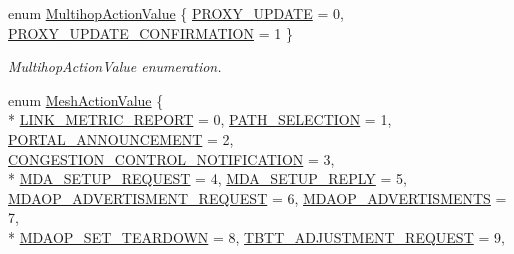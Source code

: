 \begin{DoxyCompactItemize}
\item 
enum \hyperlink{classns3_1_1WifiActionHeader_a008169268615fdeffe18e6849754fcee}{Multihop\+Action\+Value} \{ \hyperlink{classns3_1_1WifiActionHeader_a008169268615fdeffe18e6849754fceea37925ec0f02de9ccec0980046eeaea18}{P\+R\+O\+X\+Y\+\_\+\+U\+P\+D\+A\+TE} = 0, 
\hyperlink{classns3_1_1WifiActionHeader_a008169268615fdeffe18e6849754fceeaedfe0035d6f9ba6c9ad0af560d6ca578}{P\+R\+O\+X\+Y\+\_\+\+U\+P\+D\+A\+T\+E\+\_\+\+C\+O\+N\+F\+I\+R\+M\+A\+T\+I\+ON} = 1
 \}\begin{DoxyCompactList}\small\item\em Multihop\+Action\+Value enumeration. \end{DoxyCompactList}
\item 
enum \hyperlink{classns3_1_1WifiActionHeader_a7dec260ba924574c5abb38c1d8a562b1}{Mesh\+Action\+Value} \{ \\*
\hyperlink{classns3_1_1WifiActionHeader_a7dec260ba924574c5abb38c1d8a562b1a665a0ea40f45970b6905243a471f60a3}{L\+I\+N\+K\+\_\+\+M\+E\+T\+R\+I\+C\+\_\+\+R\+E\+P\+O\+RT} = 0, 
\hyperlink{classns3_1_1WifiActionHeader_a7dec260ba924574c5abb38c1d8a562b1aa04b0ca401da079d9d961d29f2f9854f}{P\+A\+T\+H\+\_\+\+S\+E\+L\+E\+C\+T\+I\+ON} = 1, 
\hyperlink{classns3_1_1WifiActionHeader_a7dec260ba924574c5abb38c1d8a562b1ab3a41fe1a59cd44192377e8a3076c89e}{P\+O\+R\+T\+A\+L\+\_\+\+A\+N\+N\+O\+U\+N\+C\+E\+M\+E\+NT} = 2, 
\hyperlink{classns3_1_1WifiActionHeader_a7dec260ba924574c5abb38c1d8a562b1a29181aa6a9cc4e12d03b749750fe1ff8}{C\+O\+N\+G\+E\+S\+T\+I\+O\+N\+\_\+\+C\+O\+N\+T\+R\+O\+L\+\_\+\+N\+O\+T\+I\+F\+I\+C\+A\+T\+I\+ON} = 3, 
\\*
\hyperlink{classns3_1_1WifiActionHeader_a7dec260ba924574c5abb38c1d8a562b1a13b27cfc684f3a86aa03209aa3aae6c1}{M\+D\+A\+\_\+\+S\+E\+T\+U\+P\+\_\+\+R\+E\+Q\+U\+E\+ST} = 4, 
\hyperlink{classns3_1_1WifiActionHeader_a7dec260ba924574c5abb38c1d8a562b1a5872a1e2e716026b96db0dab35a05d98}{M\+D\+A\+\_\+\+S\+E\+T\+U\+P\+\_\+\+R\+E\+P\+LY} = 5, 
\hyperlink{classns3_1_1WifiActionHeader_a7dec260ba924574c5abb38c1d8a562b1a3dc87b2e25545497995f3c2e08be9cfb}{M\+D\+A\+O\+P\+\_\+\+A\+D\+V\+E\+R\+T\+I\+S\+M\+E\+N\+T\+\_\+\+R\+E\+Q\+U\+E\+ST} = 6, 
\hyperlink{classns3_1_1WifiActionHeader_a7dec260ba924574c5abb38c1d8a562b1a28a11422c58f781cf30f2cb910f1a119}{M\+D\+A\+O\+P\+\_\+\+A\+D\+V\+E\+R\+T\+I\+S\+M\+E\+N\+TS} = 7, 
\\*
\hyperlink{classns3_1_1WifiActionHeader_a7dec260ba924574c5abb38c1d8a562b1a67217da6d636152401eae2636b2c4cbd}{M\+D\+A\+O\+P\+\_\+\+S\+E\+T\+\_\+\+T\+E\+A\+R\+D\+O\+WN} = 8, 
\hyperlink{classns3_1_1WifiActionHeader_a7dec260ba924574c5abb38c1d8a562b1aa5fc5d8099e8297818555decb8b6badd}{T\+B\+T\+T\+\_\+\+A\+D\+J\+U\+S\+T\+M\+E\+N\+T\+\_\+\+R\+E\+Q\+U\+E\+ST} = 9, 

\end{DoxyCompactItemize}

